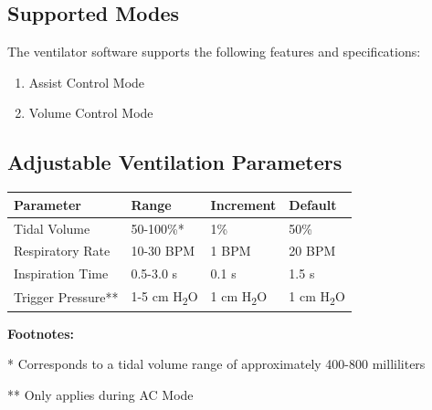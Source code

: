 \documentclass[]{article}
\begin{document}
\subsection{Supported Modes}

The ventilator software supports the following features and specifications:
\begin{enumerate}
	\item Assist Control Mode
	\item Volume Control Mode
\end{enumerate}




\subsection{Adjustable Ventilation Parameters}


\begin{center}
	\begin{table}
		
	
	\begin{tabular}{ |p{3.8cm}| p{2.2cm}| p{2.2cm}|p{2.2cm}|}
		\hline
		\textbf{Parameter} & \textbf{Range} & \textbf{Increment}& \textbf{Default} \\
		\hline 
		Tidal Volume & 50-100\%* & 1\% & 50\% \\  
		\hline
		Respiratory Rate & 10-30 BPM  & 1 BPM & 20 BPM \\ 
		\hline   
		Inspiration Time & 0.5-3.0 s& 0.1 s & 1.5 s\\
		\hline
		Trigger Pressure** & 1-5 cm H\textsubscript{2}O & 1 cm H\textsubscript{2}O& 1 cm H\textsubscript{2}O \\
		\hline
	\end{tabular}

\noindent \textbf{Footnotes:}

* Corresponds to a tidal volume range of approximately 400-800 milliliters

** Only applies during AC Mode
\end{table}
	
\end{center}
\end{document}
